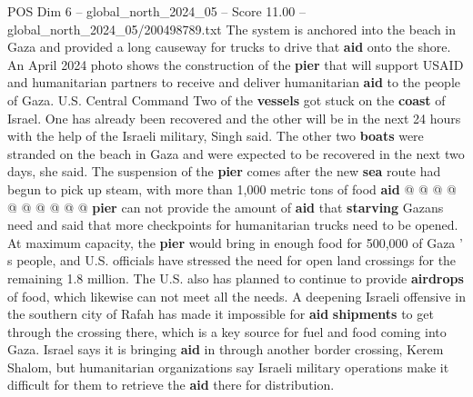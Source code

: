 \begin{textsample}{POS Dim 6 – global\_north\_2024\_05 – Score 11.00 – global\_north\_2024\_05/200498789.txt}
The system is anchored into the beach in Gaza and provided a long causeway for trucks to drive that \textbf{aid} onto the shore.
An April 2024 photo shows the construction of the \textbf{pier} that will support USAID and humanitarian partners to receive and deliver humanitarian \textbf{aid} to the people of Gaza.
U.S.
Central Command Two of the \textbf{vessels} got stuck on the \textbf{coast} of Israel.
One has already been recovered and the other will be in the next 24 hours with the help of the Israeli military, Singh said.
The other two \textbf{boats} were stranded on the beach in Gaza and were expected to be recovered in the next two days, she said.
The suspension of the \textbf{pier} comes after the new \textbf{sea} route had begun to pick up steam, with more than 1,000 metric tons of food \textbf{aid} @ @ @ @ @ @ @ @ @ @ \textbf{pier} can not provide the amount of \textbf{aid} that \textbf{starving} Gazans need and said that more checkpoints for humanitarian trucks need to be opened.
At maximum capacity, the \textbf{pier} would bring in enough food for 500,000 of Gaza ' s people, and U.S. officials have stressed the need for open land crossings for the remaining 1.8 million.
The U.S. also has planned to continue to provide \textbf{airdrops} of food, which likewise can not meet all the needs.
A deepening Israeli offensive in the southern city of Rafah has made it impossible for \textbf{aid} \textbf{shipments} to get through the crossing there, which is a key source for fuel and food coming into Gaza.
Israel says it is bringing \textbf{aid} in through another border crossing, Kerem Shalom, but humanitarian organizations say Israeli military operations make it difficult for them to retrieve the \textbf{aid} there for distribution.

\end{textsample}
